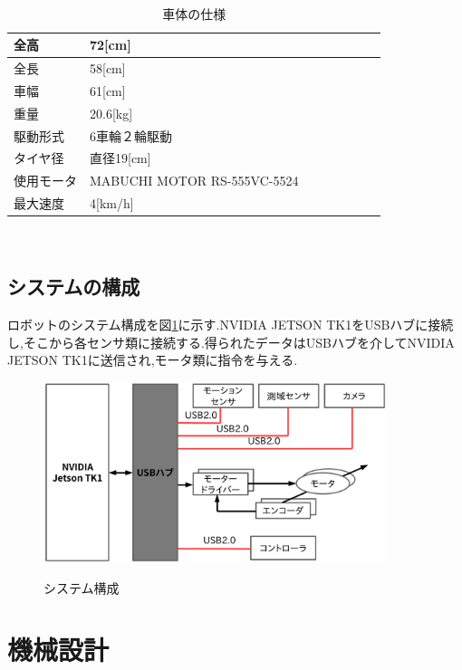 \documentclass[12pt,oneside]{sotsuken_paper}
\begin{document}
\begin{table}[htp] 
 　\begin{center} 
    \caption{車体の仕様} 
  \begin{tabular}{|l|l|l|l|l|l|l|l|} \hline 
全高 & 72[cm] \\  \hline 
全長 & 58[cm] \\ \hline 
車幅 & 61[cm] \\ \hline 
重量 & 20.6[kg] \\ \hline 
駆動形式 & 6車輪２輪駆動 \\ \hline 
タイヤ径 & 直径19[cm] \\ \hline 
使用モータ &  MABUCHI MOTOR RS-555VC-5524\\ \hline 
最大速度 & 4[km/h] \\ \hline 
  \end{tabular} 
　   \label{tab:siyou} 
  \end{center} 
\end{table} 



\subsection{システムの構成} 
ロボットのシステム構成を図\ref{fig:sisutemu}に示す.NVIDIA JETSON TK1をUSBハブに接続し,そこから各センサ類に接続する.得られたデータはUSBハブを介してNVIDIA JETSON TK1に送信され,モータ類に指令を与える. 
\begin{figure}[htp] 
 \begin{center} 
  \includegraphics[width=100mm]{img/hard/sisutemu.png} 
 　\caption{システム構成} 
  \label{fig:sisutemu}%
 \end{center} 
\end{figure} 

\section{機械設計} 
\end{document}
